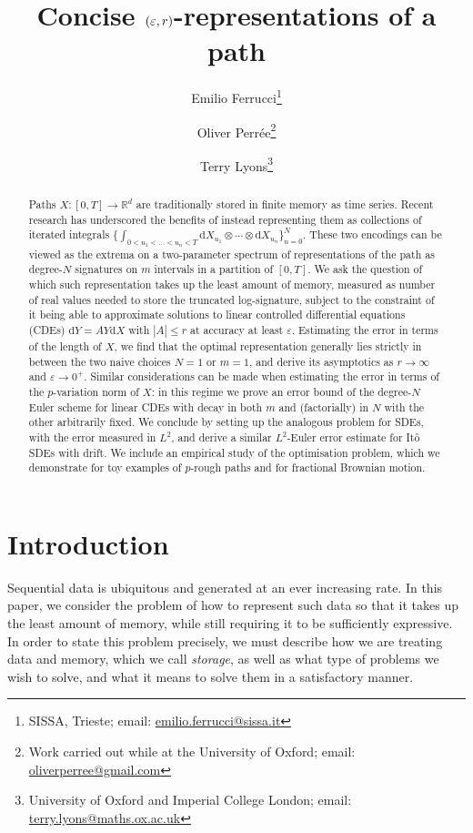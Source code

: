 \documentclass{article}
\title{Concise $(\eps,r)$-representations of a path}
\author{Emilio Ferrucci\thanks{SISSA, Trieste; email: \href{mailto:emilio.ferrucci@sissa.it}{emilio.ferrucci@sissa.it}} \and Oliver Perrée\thanks{Work carried out while at the University of Oxford; email: \href{mailto:oliverperree@gmail.com}{oliverperree@gmail.com}} \and Terry Lyons\thanks{University of Oxford and Imperial College London; email: \href{mailto:terry.lyons@maths.ox.ac}{terry.lyons@maths.ox.ac.uk}}}
\def\d{\mathrm{d}}
\def\eps{\varepsilon}
\numberwithin{equation}{section}
\theoremstyle{definition}
\theoremstyle{remark}
\begin{document}
\maketitle


\begin{abstract}
Paths $X \colon [0,T] \to \mathbb R^d$ are traditionally stored in finite memory as time series. Recent research has underscored the benefits of instead representing them as collections of iterated integrals $\{\int_{0 < u_1 < \ldots < u_n < T} \d X_{u_1} \otimes \cdots \otimes \d X_{u_n}\}_{n = 0}^N$. These two encodings can be viewed as the extrema on a two-parameter spectrum of representations of the path as degree-$N$ signatures on $m$ intervals in a partition of $[0,T]$. We ask the question of which such representation takes up the least amount of memory, measured as number of real values needed to store the truncated log-signature, subject to the constraint of it being able to approximate solutions to linear controlled differential equations (CDEs) $\d Y = AY\d X$ with $|A| \leq r$ at accuracy at least $\eps$. Estimating the error in terms of the length of $X$, we find that the optimal representation generally lies strictly in between the two naive choices $N = 1$ or $m = 1$, and derive its asymptotics as $r \to \infty$ and $\eps \to 0^+$. Similar considerations can be made when estimating the error in terms of the $p$-variation norm of $X$: in this regime we prove an error bound of the degree-$N$ Euler scheme for linear CDEs with decay in both $m$ and (factorially) in $N$ with the other arbitrarily fixed. We conclude by setting up the analogous problem for SDEs, with the error measured in $L^2$, and derive a similar $L^2$-Euler error estimate for It\^o SDEs with drift. We include an empirical study of the optimisation problem, which we demonstrate for toy examples of $p$-rough paths and for fractional Brownian motion.
\end{abstract}


\section*{Introduction}


Sequential data is ubiquitous and generated at an ever increasing rate. In this paper, we consider the problem of how to represent such data so that it takes up the least amount of memory, while still requiring it to be sufficiently expressive. In order to state this problem precisely, we must describe how we are treating data and memory, which we call \emph{storage}, as well as what type of problems we wish to solve, and what it means to solve them in a satisfactory manner.
\end{document}
